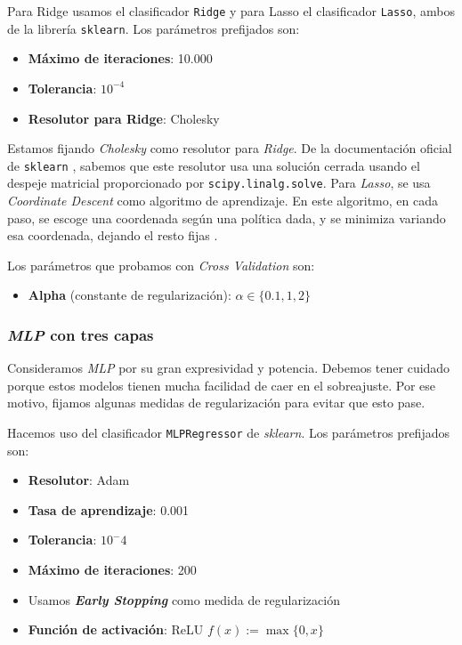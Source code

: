 \documentclass[11pt]{article}
\begin{document}
Para Ridge usamos el clasificador \lstinline{Ridge} y para Lasso el clasificador \lstinline{Lasso}, ambos de la librería \lstinline{sklearn}. Los parámetros prefijados son:

\begin{itemize}
  \item \textbf{Máximo de iteraciones}: 10.000
  \item \textbf{Tolerancia}: $10^{-4}$
  \item \textbf{Resolutor para Ridge}: Cholesky
\end{itemize}

Estamos fijando \emph{Cholesky} como resolutor para \emph{Ridge}. De la documentación oficial de \lstinline{sklearn} \cite{sk_linear:online}, sabemos que  este resolutor usa una solución cerrada usando el despeje matricial proporcionado por \lstinline{scipy.linalg.solve}. Para \emph{Lasso}, se usa \emph{Coordinate Descent} como algoritmo de aprendizaje. En este algoritmo, en cada paso, se escoge una coordenada según una política dada, y se minimiza variando esa coordenada, dejando el resto fijas \cite{coordinate_descent:online}.

Los parámetros que probamos con \emph{Cross Validation} son:

\begin{itemize}
  \item \textbf{Alpha} (constante de regularización): $\alpha \in \{0.1, 1, 2\}$
\end{itemize}

\subsubsection{\emph{MLP} con tres capas} \label{mlp}

Consideramos \emph{MLP} por su gran expresividad y potencia. Debemos tener cuidado porque estos modelos tienen mucha facilidad de caer en el sobreajuste. Por ese motivo, fijamos algunas medidas de regularización para evitar que esto pase.

Hacemos uso del clasificador \lstinline{MLPRegressor} de \emph{sklearn}. Los parámetros prefijados son:

\begin{itemize}
  \item \textbf{Resolutor}: Adam
  \item \textbf{Tasa de aprendizaje}: 0.001
  \item \textbf{Tolerancia}: $10^-4$
  \item \textbf{Máximo de iteraciones}: 200
  \item Usamos \textbf{\emph{Early Stopping}} como medida de regularización
  \item \textbf{Función de activación}: ReLU $f(x) := \max\{0,x\}$
\end{itemize}
\end{document}

